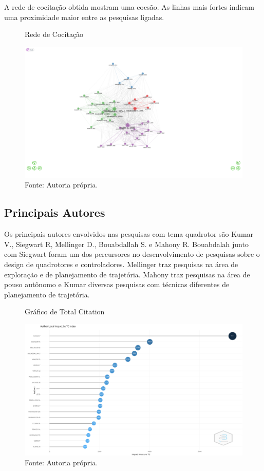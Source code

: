 A rede de cocitação obtida mostram uma coesão. As linhas mais fortes indicam uma proximidade maior entre as pesquisas ligadas. 
\clearpage
\begin{figure} [h!]	
    \centering
    \caption{Rede de Cocitação}
    \includegraphics[width=1\textwidth,trim={0 6cm 0 
    4cm},clip]{Figures/network.png}
    \caption*{Fonte: Autoria própria.}
    \label{fig:cocitacao}
  \end{figure}

\subsection{Principais Autores}

Os principais autores envolvidos nas pesquisas com tema quadrotor são Kumar V., Siegwart R, Mellinger D., Bouabdallah S. e Mahony R. Bouabdalah junto com Siegwart foram um dos percursores no desenvolvimento de pesquisas sobre o design de quadrotores e controladores. Mellinger traz pesquisas na área de exploração e de planejamento de trajetória. Mahony traz pesquisas na área de pouso autônomo e Kumar diversas pesquisas com técnicas diferentes de planejamento de trajetória.
\clearpage
\begin{figure} [h]	
    \centering
    \caption{Gráfico de Total Citation}
    \includegraphics[width=1\textwidth,trim={0 0.8cm 0 
    1cm},clip]{Figures/newplot.png}
    \caption*{Fonte: Autoria própria.}
    \label{fig:autores}
\end{figure}

